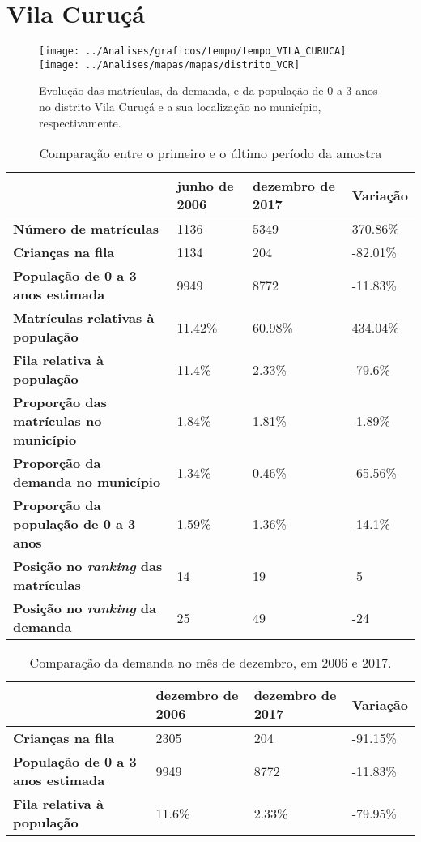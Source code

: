 \section{Vila Curuçá}
\begin{figure}[H]
	\centering
	\texttt{[image: ../Analises/graficos/tempo/tempo\_VILA\_CURUCA]}
	\texttt{[image: ../Analises/mapas/mapas/distrito\_VCR]}
	\caption{Evolução das matrículas, da demanda, e da população de 0 a 3 anos no distrito Vila Curuçá e a sua localização no município, respectivamente.}
\end{figure}
\begin{table}[H]
	\begin{tabular}{|l|l|l|l|}
		\hline
		\textbf{}                                      & \textbf{junho de 2006}       & \textbf{dezembro de 2017}    & \textbf{Variação} \\ \hline
		\textbf{Número de matrículas}                  & 1136 & 5349 & 370.86\% \\ \hline
		\textbf{Crianças na fila}                      & 1134 & 204 & -82.01\% \\ \hline
		\textbf{População de 0 a 3 anos estimada}      & 9949 & 8772 & -11.83\% \\ \hline
		\textbf{Matrículas relativas à população}      & 11.42\% & 60.98\% & 434.04\% \\ \hline
		\textbf{Fila relativa à população}             & 11.4\% & 2.33\% & -79.6\% \\ \hline
		\textbf{Proporção das matrículas no município} & 1.84\% & 1.81\% & -1.89\% \\ \hline
		\textbf{Proporção da demanda no município}     & 1.34\% & 0.46\% & -65.56\% \\ \hline
		\textbf{Proporção da população de 0 a 3 anos}  & 1.59\% & 1.36\% & -14.1\% \\ \hline
		\textbf{Posição no \textit{ranking} das matrículas}     & 14 & 19 & -5 \\ \hline
		\textbf{Posição no \textit{ranking} da demanda}         & 25 & 49 & -24 \\ \hline
	\end{tabular}
	\caption{Comparação entre o primeiro e o último período da amostra}
\end{table}
\begin{table}[H]
	\begin{tabular}{|l|l|l|l|}
		\hline
		\textbf{}                                 & \textbf{dezembro de 2006} & \textbf{dezembro de 2017} & \textbf{Variação} \\ \hline
		\textbf{Crianças na fila}                      & 2305 & 204 & -91.15\% \\ \hline
		\textbf{População de 0 a 3 anos estimada}      & 9949 & 8772 & -11.83\% \\ \hline
		\textbf{Fila relativa à população}             & 11.6\% & 2.33\% & -79.95\% \\ \hline
	\end{tabular}
	\caption{Comparação da demanda no mês de dezembro, em 2006 e 2017.}
\end{table}
